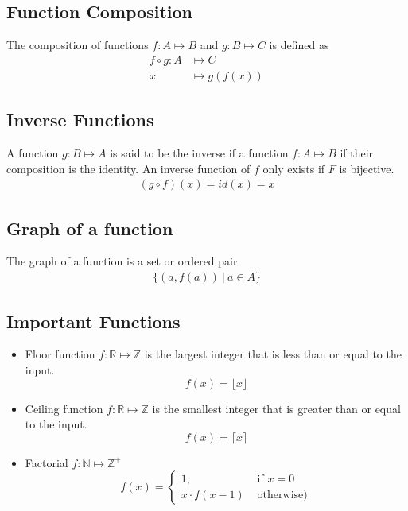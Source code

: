 \documentclass{article}
\theoremstyle{mytheoremstyle}
\theoremstyle{mytheoremstyle}
\theoremstyle{myproblemstyle}
\newcommand{\ceil}[1]{\lceil#1\rceil}
\newcommand{\floor}[1]{\lfloor#1\rfloor}
\begin{document}
    \subsection*{Function Composition}
    The composition of functions $f: A \mapsto B$ and $g: B \mapsto C$ is
    defined as
    \begin{align*}
        f \circ g: A&\mapsto C \\
        x &\mapsto g(f(x))
    \end{align*}

    \subsection*{Inverse Functions}
    A function $g: B \mapsto A$ is said to be the inverse if a function $f: A
    \mapsto B$ if their composition is the identity. An inverse function of $f$
    only exists if $F$ is bijective.
    \begin{align*}
        (g \circ f) (x) = id(x) = x
    \end{align*}

    \subsection*{Graph of a function}
    The graph of a function is a set or ordered pair
    \begin{align*}
        \{ (a, f(a))\ |\ a \in A\}
    \end{align*}

    \subsection*{Important Functions}
    \begin{itemize}
        \item Floor function $f: \mathbb{R} \mapsto \mathbb{Z}$ is the largest
            integer that is less than or equal to the input.
            \[
                f(x) = \floor{x}
            \]
        \item Ceiling function $f: \mathbb{R} \mapsto \mathbb{Z}$ is the
            smallest integer that is greater than or equal to the input.
            \[
                f(x) = \ceil{x}
            \]
        \item Factorial $f: \mathbb{N} \mapsto \mathbb{Z}^+$
            \[
                f(x) = \begin{cases}
                    1,              &\text{ if }x = 0\\
                    x \cdot f(x-1)  &\text{ otherwise})
                \end{cases}
            \]
    \end{itemize}
\end{document}
